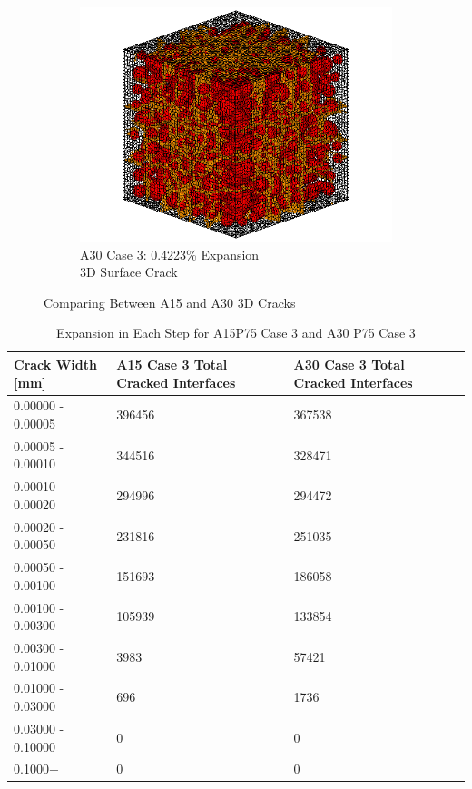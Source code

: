 \begin{figure}[ht!]
\begin{subfigure}{.5\textwidth}
      \includegraphics[width=.8\linewidth]{Files/exp_3D/DEF/A30X0C_3_c.png}
    \caption{A30 Case 3: 0.4223\% Expansion\\ 3D Surface Crack}
    \end{subfigure}


  \caption{Comparing Between A15 and A30 3D Cracks}
  \label{fig:DEF_A15vsA30X0C_3D}
\end{figure}

\begin{table}[!h]
\centering
\begin{tabular}{ ||p{4cm}|p{4cm}|p{4cm}|| }
\hline
 Crack Width [mm] &  A15 Case 3 Total Cracked Interfaces &  A30 Case 3 Total Cracked Interfaces \\
 \hline\hline

   0.00000 - 0.00005 & 396456 & 367538 \\
   0.00005 - 0.00010 & 344516 & 328471 \\
   0.00010 - 0.00020 & 294996 & 294472 \\
   0.00020 - 0.00050 & 231816 & 251035 \\
   0.00050 - 0.00100 & 151693 & 186058 \\
   0.00100 - 0.00300 & 105939 & 133854 \\
   0.00300 - 0.01000 &  3983 &  57421\\
   0.01000 - 0.03000 & 696 & 1736 \\
   0.03000 - 0.10000 & 0 & 0 \\
   0.1000+ & 0 & 0 \\

  \hline
  \end{tabular}
\caption{Expansion in Each Step for A15P75 Case 3 and A30 P75 Case 3}
\label{table:A15vsA30P75_3_Cracks}
\end{table}


